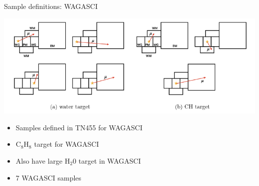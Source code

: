 \documentclass{beamer}
\begin{document}
\begin{frame}{Sample definitions: WAGASCI}

\includegraphics[width=\textwidth]{images/wag_sam.png}
\begin{itemize}
    \item Samples defined in TN455 for WAGASCI
    \item C$_8$H$_8$ target for WAGASCI 
    \item Also have large H$_2$0 target in WAGASCI \
    \item 7 WAGASCI samples 
\end{itemize}    
\vfill

\end{frame}
\end{document}
